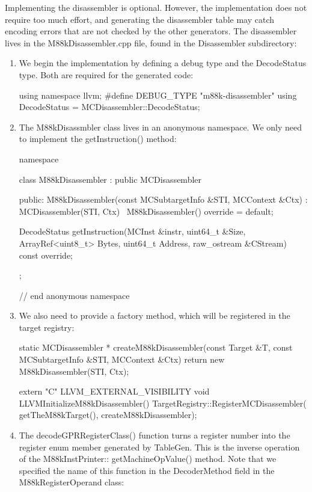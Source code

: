 Implementing the disassembler is optional. However, the implementation does not require too much effort, and generating the disassembler table may catch encoding errors that are not checked by the other generators. The disassembler lives in the M88kDisassembler.cpp file, found in the Disassembler subdirectory:

\begin{enumerate}
\item
We begin the implementation by defining a debug type and the DecodeStatus type. Both are required for the generated code:

\begin{cpp}
using namespace llvm;
#define DEBUG_TYPE "m88k-disassembler"
using DecodeStatus = MCDisassembler::DecodeStatus;
\end{cpp}

\item
The M88kDisassmbler class lives in an anonymous namespace. We only need to implement the getInstruction() method:

\begin{cpp}
namespace {
class M88kDisassembler : public MCDisassembler {
public:
    M88kDisassembler(const MCSubtargetInfo &STI,
                     MCContext &Ctx)
        : MCDisassembler(STI, Ctx) {}
    ~M88kDisassembler() override = default;

    DecodeStatus
    getInstruction(MCInst &instr, uint64_t &Size,
                    ArrayRef<uint8_t> Bytes,
                    uint64_t Address,
                    raw_ostream &CStream) const override;
};
} // end anonymous namespace
\end{cpp}

\item
We also need to provide a factory method, which will be registered in the target registry:

\begin{cpp}
static MCDisassembler *
createM88kDisassembler(const Target &T,
                        const MCSubtargetInfo &STI,
                        MCContext &Ctx) {
    return new M88kDisassembler(STI, Ctx);
}

extern "C" LLVM_EXTERNAL_VISIBILITY void
LLVMInitializeM88kDisassembler() {
    TargetRegistry::RegisterMCDisassembler(
        getTheM88kTarget(), createM88kDisassembler);
}
\end{cpp}

\item
The decodeGPRRegisterClass() function turns a register number into the register enum member generated by TableGen. This is the inverse operation of the M88kInstPrinter:: getMachineOpValue() method. Note that we specified the name of this function in the DecoderMethod field in the M88kRegisterOperand class:


\end{enumerate}
